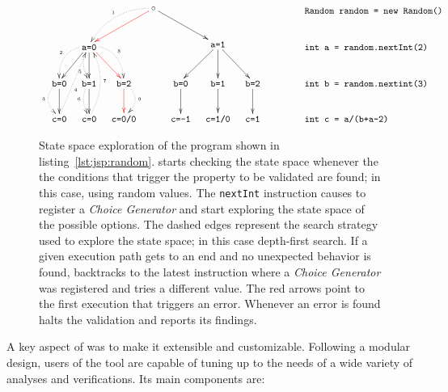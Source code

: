 \begin{figure}[t]
\centering
\[\xymatrix@C=1em{
	& & & \ar@[red][lld] \ar@/_1pc/@{.>}[lld]_{\txt{\tiny 1}} \circ \ar[rrd] & & & & \txt{\texttt{~~~~~~Random random = new Random()}} \\
	& \ar[ld] \ar@/_1pc/@{.>}[ld]_{\txt{\tiny 2}} \ar[d] \ar@/_/@{.>}[d]_(0.7){\txt{\tiny 5}} \txt{\texttt{a=0}} \ar@[red][rd] \ar@/^1pc/@{.>}[rd]^{\txt{\tiny 8}} & & & & 
	  \ar[ld] \ar[d] \texttt{a=1} \ar[rd] & & \txt{\texttt{~~~int a = random.nextInt(2)}} \\
	\ar[d] \ar@/_1pc/@{.>}[d]_{\txt{\tiny 3}} \txt{\texttt{b=0}} & 
	\ar[d] \ar@/_/@{.>}[d]_{\txt{\tiny 6}} \txt{\texttt{b=1}} & 
	\ar@[red][d] \ar@/^1pc/@{.>}[d]^{\txt{\tiny 9}} \txt{\texttt{b=2}} & & 
	\ar[d] \txt{\texttt{b=0}} & 
	\ar[d] \txt{\texttt{b=1}} & 
	\ar[d] \txt{\texttt{b=2}} & \txt{\texttt{~~~int b = random.nextint(3)}} \\
	\txt{\texttt{c=0}} \ar@{.>}[ruu]_(0.4){\txt{\tiny 4}} & 
	\ar@/_1pc/@{.>}[uu]_{\txt{\tiny 7}} \txt{\texttt{c=0}} & 
	\txt{\texttt{c=0/0}} & & 
	\txt{\texttt{c=-1}} & 
	\txt{\texttt{c=1/0}} & 
	\txt{\texttt{c=1}} & 
	\txt{\texttt{int c = a/(b+a-2)~~~~~~}}
} \]
\caption[State space exploration of an example program]{State space exploration of the program shown in listing~\ref{lst:jsp:random}. \jpf{} starts checking the state space whenever the the conditions that trigger the property to be validated are found; in this case, using random values. The \texttt{nextInt} instruction causes \jpf{} to register a \textit{Choice Generator} and start exploring the state space of the possible options. The dashed edges represent the search strategy used to explore the state space; in this case depth-first search. If a given execution path gets to an end and no unexpected behavior is found, \jpf{} backtracks to the latest instruction where a \textit{Choice Generator} was registered and tries a different value. The red arrows point to the first execution that triggers an error. Whenever an error is found \jpf{} halts the validation and reports its findings.}
\label{fig:jpf:random}
\end{figure}

A key aspect of \jpf{} was to make it extensible and customizable. Following a modular design, users of the tool are capable of tuning \jpf{} up to the needs of a wide variety of analyses and verifications. Its main components are:

